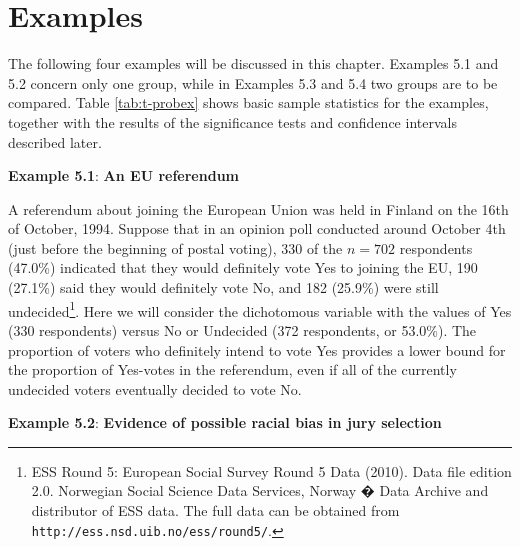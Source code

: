 \documentclass[11pt,a4paper,openany]{book}
\let\rmarkdownfootnote\footnote%
\def\footnote{\protect\rmarkdownfootnote}
\begin{document}
\section{Examples}\label{s-probs-examples}

The following four examples will be discussed in this chapter. Examples
5.1 and 5.2 concern only one group, while in Examples 5.3 and 5.4 two
groups are to be compared. Table \ref{tab:t-probex} shows basic sample
statistics for the examples, together with the results of the
significance tests and confidence intervals described later.

\textbf{Example 5.1}: \textbf{An EU referendum}

A referendum about joining the European Union was held in Finland on the
16th of October, 1994. Suppose that in an opinion poll conducted around
October 4th (just before the beginning of postal voting), 330 of the
\(n=702\) respondents (47.0\%) indicated that they would definitely vote
Yes to joining the EU, 190 (27.1\%) said they would definitely vote No,
and 182 (25.9\%) were still undecided\footnote{ESS Round 5: European
  Social Survey Round 5 Data (2010). Data file edition 2.0. Norwegian
  Social Science Data Services, Norway � Data Archive and distributor of
  ESS data. The full data can be obtained from
  \texttt{http://ess.nsd.uib.no/ess/round5/}.}. Here we will consider
the dichotomous variable with the values of Yes (330 respondents) versus
No or Undecided (372 respondents, or 53.0\%). The proportion of voters
who definitely intend to vote Yes provides a lower bound for the
proportion of Yes-votes in the referendum, even if all of the currently
undecided voters eventually decided to vote No.

\textbf{Example 5.2}: \textbf{Evidence of possible racial bias in jury
selection}
\end{document}
